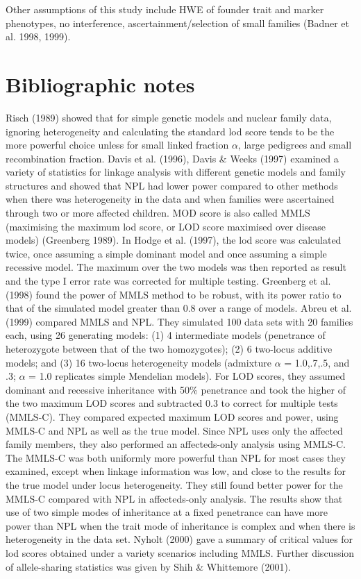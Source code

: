 Other assumptions of this study include HWE of founder trait and marker
phenotypes, no interference, ascertainment/selection of small families (Badner
et al.  1998, 1999).


\section{Bibliographic notes}

Risch (1989) showed that for simple genetic models and nuclear family
data, ignoring heterogeneity and calculating the standard lod score tends
to be the more powerful choice unless for small linked fraction $\alpha$,
large pedigrees and small recombination fraction. Davis et al.  (1996),
Davis \& Weeks (1997) examined a variety of statistics for linkage
analysis with different genetic models and family structures and showed
that NPL had lower power compared to other methods when there was
heterogeneity in the data and when families were ascertained through two
or more affected children. MOD score is also called MMLS (maximising the
maximum lod score, or LOD score maximised over disease models) (Greenberg
1989).  In Hodge et al.  (1997), the lod score was calculated twice, once
assuming a simple dominant model and once assuming a simple recessive
model.  The maximum over the two models was then reported as result and
the type I error rate was corrected for multiple testing.  Greenberg et
al.  (1998) found the power of MMLS method to be robust, with its power
ratio to that of the simulated model greater than 0.8 over a range of
models.  Abreu et al.  (1999) compared MMLS and NPL.  They simulated 100
data sets with 20 families each, using 26 generating models:  (1) 4
intermediate models (penetrance of heterozygote between that of the two
homozygotes); (2) 6 two-locus additive models; and (3) 16 two-locus
heterogeneity models (admixture $\alpha$ = 1.0,.7,.5, and .3; $\alpha$ =
1.0 replicates simple Mendelian models).  For LOD scores, they assumed
dominant and recessive inheritance with 50\% penetrance and took the
higher of the two maximum LOD scores and subtracted 0.3 to correct for
multiple tests (MMLS-C). They compared expected maximum LOD scores and
power, using MMLS-C and NPL as well as the true model.  Since NPL uses
only the affected family members, they also performed an affecteds-only
analysis using MMLS-C.  The MMLS-C was both uniformly more powerful than
NPL for most cases they examined, except when linkage information was low,
and close to the results for the true model under locus heterogeneity.  
They still found better power for the MMLS-C compared with NPL in
affecteds-only analysis.  The results show that use of two simple modes of
inheritance at a fixed penetrance can have more power than NPL when the
trait mode of inheritance is complex and when there is heterogeneity in
the data set.  Nyholt (2000) gave a summary of critical values for lod
scores obtained under a variety scenarios including MMLS.  Further
discussion of allele-sharing statistics was given by Shih \& Whittemore
(2001).
